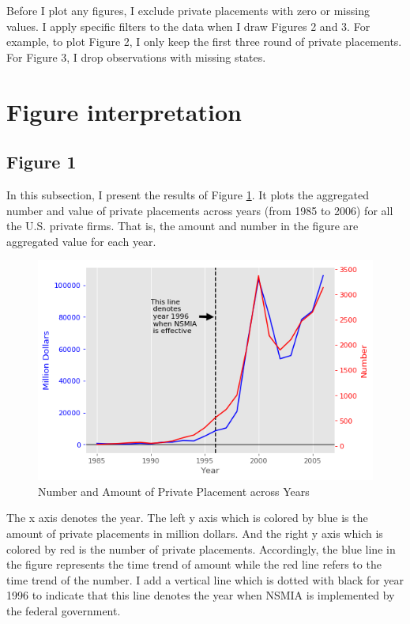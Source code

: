 \documentclass[letterpaper,12pt]{article}
\theoremstyle{definition}
\begin{document}
Before I plot any figures, I exclude private placements with zero or missing values. I apply specific filters to the data when I draw Figures 2 and 3. For example, to plot Figure 2, I only keep the first three round of private placements. For Figure 3, I drop observations with missing states.

\section{Figure interpretation}

\subsection{Figure 1}

In this subsection, I present the results of Figure \ref{fig:figure1}. It plots the aggregated number and value of private placements across years (from 1985 to 2006) for all the U.S. private firms. That is, the amount and number in the figure are aggregated value for each year.

\begin{figure}[h]
	\centering
	\includegraphics[width=\textwidth]{figure1}
	\caption{Number and Amount of Private Placement across Years}
	\label{fig:figure1}
\end{figure}

The x axis denotes the year. The left y axis which is colored by blue is the amount of private placements in million dollars. And the right y axis which is colored by red is the number of private placements. Accordingly, the blue line in the figure represents the time trend of amount while the red line refers to the time trend of the number. I add a vertical line which is dotted with black for year 1996 to indicate that this line denotes the year when NSMIA is implemented by the federal government.
\end{document}
